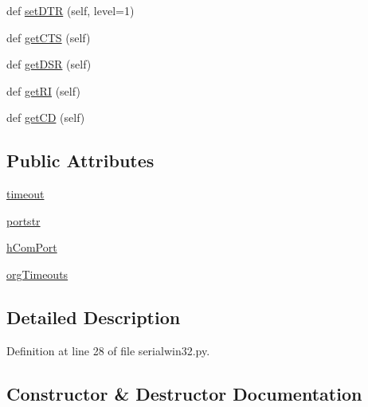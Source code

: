\begin{DoxyCompactItemize}
\item 
def \hyperlink{classserial_1_1serialwin32_1_1_serial_a3a6b95530888a9c9586b118fc5ff87f9}{set\+D\+TR} (self, level=1)
\item 
def \hyperlink{classserial_1_1serialwin32_1_1_serial_ade4d0f974609a5b939a5bfd5981366fc}{get\+C\+TS} (self)
\item 
def \hyperlink{classserial_1_1serialwin32_1_1_serial_ab5f7f1614c415b93497e36f7ad6f4cd8}{get\+D\+SR} (self)
\item 
def \hyperlink{classserial_1_1serialwin32_1_1_serial_a0f41fe1d63daed84116998b67b9787d2}{get\+RI} (self)
\item 
def \hyperlink{classserial_1_1serialwin32_1_1_serial_a667d1aa58fadf0dd89612b7f707e44d6}{get\+CD} (self)
\end{DoxyCompactItemize}
\subsection*{Public Attributes}
\begin{DoxyCompactItemize}
\item 
\hyperlink{classserial_1_1serialwin32_1_1_serial_ae703b88bd0d51ad74f5a26930a87c4ae}{timeout}
\item 
\hyperlink{classserial_1_1serialwin32_1_1_serial_ac8af1a65407a925ad3a0f8e1a704e054}{portstr}
\item 
\hyperlink{classserial_1_1serialwin32_1_1_serial_a7c4227fd3873cc50afc7685e0f8dfbee}{h\+Com\+Port}
\item 
\hyperlink{classserial_1_1serialwin32_1_1_serial_ad83b96a33d9ff14a24564e3edd6a13d5}{org\+Timeouts}
\end{DoxyCompactItemize}


\subsection{Detailed Description}


Definition at line 28 of file serialwin32.\+py.



\subsection{Constructor \& Destructor Documentation}
